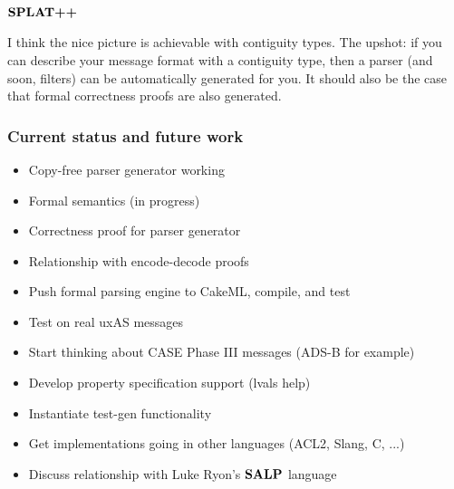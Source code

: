 \documentclass{beamer}
\newcommand{\konst}[1]{\ensuremath{\mbox{\bf{#1}}}}
\begin{document}
\begin{frame}\frametitle{\konst{SPLAT++}}

I think the nice picture is achievable with contiguity types. The
upshot: if you can describe your message format with a contiguity
type, then a parser (and soon, filters) can be automatically generated
for you. It should also be the case that formal correctness proofs are
also generated.

\vspace*{10mm}

\end{frame}

\begin{frame}\frametitle{Current status and future work}

\begin{itemize}
\item Copy-free parser generator working
\item Formal semantics (in progress)
\item Correctness proof for parser generator
\item Relationship with encode-decode proofs
\item Push formal parsing engine to CakeML, compile, and test
\item Test on real uxAS messages
\item Start thinking about CASE Phase III messages (ADS-B for example)
\item Develop property specification support (lvals help)
\item Instantiate test-gen functionality
\item Get implementations going in other languages (ACL2, Slang, C, ...)
\item Discuss relationship with Luke Ryon's \konst{SALP} language
\end{itemize}
\end{frame}
\end{document}
